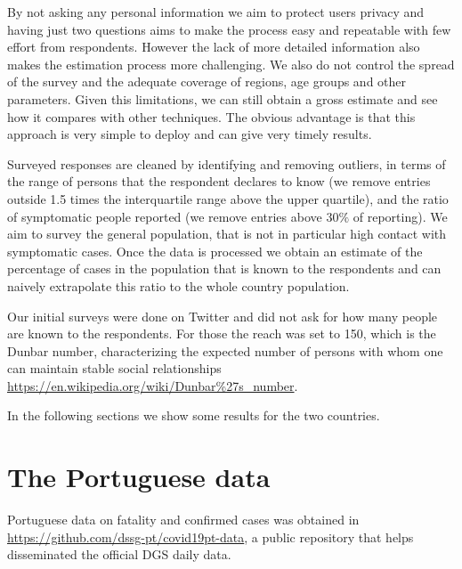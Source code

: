 \documentclass{article}
\begin{document}
By not asking any personal information we aim to protect users privacy and having just two questions aims to make the process easy and repeatable with few effort from respondents. However the lack of more detailed information also makes the estimation process more challenging. We also do not control the spread of the survey and the adequate coverage of regions, age groups and other parameters.
Given this limitations, we can still obtain a gross estimate and see how it compares with other techniques. The obvious advantage is that this approach is very simple to deploy and can give very timely results. 

Surveyed responses are cleaned by identifying and removing outliers, in terms of the range of persons that the respondent declares to know (we remove entries outside 1.5 times the interquartile range above the upper quartile), and the ratio of symptomatic people reported (we remove entries above $30\%$ of reporting). We aim to survey the general population, that is not in particular high contact with symptomatic cases. Once the data is processed we obtain an estimate of the percentage of cases in the population that is known to the respondents and can naively extrapolate this ratio to the whole country population. 


Our initial surveys were done on Twitter and did not ask for how many people are known to the respondents. For those the reach was set to 150, which is the Dunbar number, characterizing the expected number of persons with whom one can maintain stable social relationships \url{https://en.wikipedia.org/wiki/Dunbar%27s_number}. 

In the following sections we show some results for the two countries. 

\section{The Portuguese data}

Portuguese data on fatality and confirmed cases was obtained in \url{https://github.com/dssg-pt/covid19pt-data}, a public repository that helps disseminated the official DGS daily data.
\end{document}
